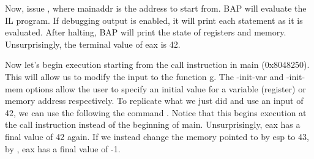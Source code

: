 Now, issue , where mainaddr
is the address to start from.  BAP will evaluate the IL program.  If
debugging output is enabled, it will print each statement as it is
evaluated.  After halting, BAP will print the state of registers and
memory. Unsurprisingly, the terminal value of eax is 42.  

Now let's begin execution starting from the call instruction in main
(0x8048250). This will allow us to modify the input to the function
g. The -init-var and -init-mem options allow the user to specify an
initial value for a variable (register) or memory address
respectively.  To replicate what we just did and use an input of 42,
we can use the following the command . Notice that this
begins execution at the call instruction instead of the beginning of
main.  Unsurprisingly, eax has a final value of 42 again.  If we
instead change the memory pointed to by esp to 43, by , eax has
a final value of -1.
